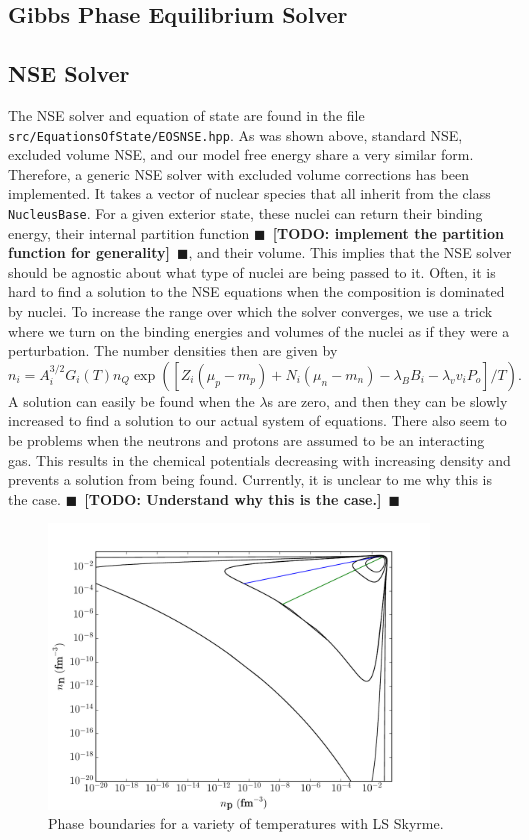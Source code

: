 \documentclass[11pt,letter]{article}
\newcommand{\todo}[1]{{$\blacksquare$~\textbf{\color{blue}[TODO: #1]}}~$\blacksquare$}
\begin{document}
\subsection{Gibbs Phase Equilibrium Solver}
\subsection{NSE Solver}
The NSE solver and equation of state are found in the file \texttt{src/EquationsOfState/EOSNSE.hpp}.  As was shown above, standard NSE, excluded volume NSE, and our model free energy share a very similar form.  Therefore, a generic NSE solver with excluded volume corrections has been implemented.  It takes a vector of nuclear species that all inherit from the class \texttt{NucleusBase}.  For a given exterior state, these nuclei can return their binding energy, their internal partition function \todo{implement the partition function for generality}, and their volume.  This implies that the NSE solver should be agnostic about what type of nuclei are being passed to it.  Often, it is hard to find a solution to the NSE equations when the composition is dominated by nuclei.  To increase the range over which the solver converges, we use a trick where we turn on the binding energies and volumes of the nuclei as if they were a perturbation.  The number densities then are given by 
\begin{equation}
n_{i} = A_i^{3/2} G_i(T) n_Q \exp\left(\left[Z_i (\mu_p - m_p) + N_i (\mu_n - m_n) 
- \lambda_B B_i - \lambda_v v_i P_o \right]/T\right).
\end{equation}
A solution can easily be found when the $\lambda$s are zero, and then they can be slowly increased to find a solution to our actual system of equations.   There also seem to be problems when the neutrons and protons are assumed to be an interacting gas.  This results in the chemical potentials decreasing with increasing density and prevents a solution from being found.  Currently, it is unclear to me why this is the case. \todo{Understand why this is the case.}

\begin{figure}[t]
\centering
\includegraphics[width=0.9\textwidth]{PhaseBoundaryDensity.pdf}
\vspace*{-0.35cm}
\caption{ Phase boundaries for a variety of temperatures with LS Skyrme.}
\vspace*{-0.7cm}
\end{figure}
\end{document}
